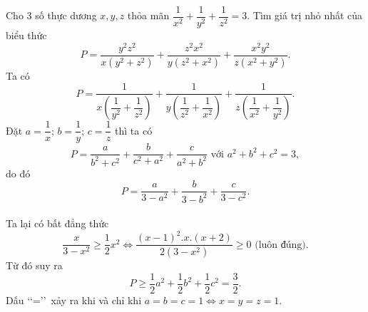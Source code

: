 \begin{ex}%
Cho 3 số thực dương $x,y,z$ thỏa mãn $\dfrac{1}{x^2}+\dfrac{1}{y^2}+\dfrac{1}{z^2}=3$. Tìm giá trị nhỏ nhất của biểu thức
	$$P=\dfrac{y^2z^2}{x(y^2+z^2)}+\dfrac{z^2x^2}{y(z^2+x^2)}+\dfrac{x^2y^2}{z(x^2+y^2)}.$$
\loigiai
    {
    Ta có 
    $$P=\dfrac{1}{x\left(\dfrac{1}{y^2}+\dfrac{1}{z^2}\right)}+\dfrac{1}{y\left(\dfrac{1}{z^2}+\dfrac{1}{x^2}\right)}+\dfrac{1}{z\left(\dfrac{1}{x^2}+\dfrac{1}{y^2}\right)}.$$
    Đặt $a=\dfrac{1}{x}$; $b=\dfrac{1}{y}$; $c=\dfrac{1}{z}$ thì ta có
    $$P=\dfrac{a}{b^2+c^2}+\dfrac{b}{c^2+a^2}+\dfrac{c}{a^2+b^2} \mbox{ với } a^2+b^2+c^2=3,$$
    do đó $$P=\dfrac{a}{3-a^2}+\dfrac{b}{3-b^2}+\dfrac{c}{3-c^2}.$$\\
    Ta lại có bất đẳng thức 
    $$\dfrac{x}{3-x^2}\ge \dfrac{1}{2}x^2\Leftrightarrow \dfrac{(x-1)^2.x.(x+2)}{2(3-x^2)}\ge 0 \mbox{ (luôn đúng).}$$
    Từ đó suy ra $$P\ge \dfrac{1}{2}a^2+\dfrac{1}{2}b^2+\dfrac{1}{2}c^2=\dfrac{3}{2}.$$
    Dấu \lq\lq=\rq\rq \ xảy ra khi và chỉ khi $a=b=c=1\Leftrightarrow x=y=z=1$.
    }
\end{ex}
